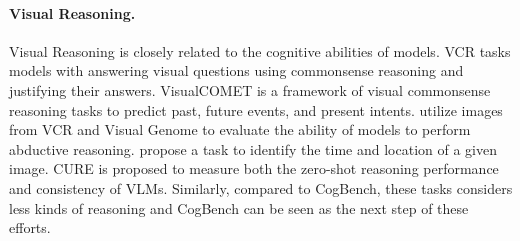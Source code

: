 \paragraph{Visual Reasoning.}
Visual Reasoning is closely related to the cognitive abilities of models.
VCR \cite{zellers2019vcr} tasks models with answering visual questions using commonsense reasoning and justifying their answers.
VisualCOMET \cite{park2020visualcomet} is a framework of visual commonsense reasoning tasks to predict past, future events, and present intents.
\citet{hessel2022abduction} utilize images from VCR and Visual Genome \cite{krishna2017visual} to evaluate the ability of models to perform abductive reasoning.
\citet{FZCVR22} propose a task to identify the time and location of a given image.
CURE \cite{chen2023measuring} is proposed to measure both the zero-shot reasoning performance and consistency of VLMs. 
Similarly, compared to CogBench, these tasks considers less kinds of reasoning and CogBench can be seen as the next step of these efforts.

